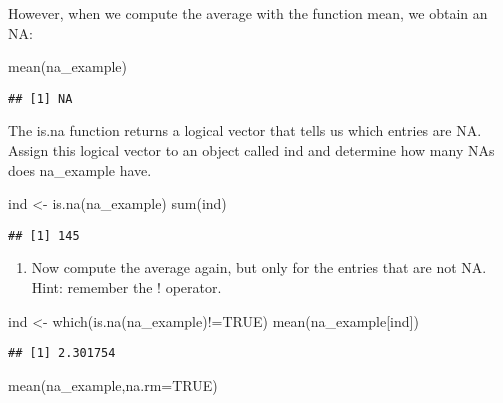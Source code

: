 \documentclass[
]{article}
\newenvironment{Shaded}{\begin{snugshade}}{\end{snugshade}}
\newcommand{\AttributeTok}[1]{\textcolor[rgb]{0.77,0.63,0.00}{#1}}
\newcommand{\ConstantTok}[1]{\textcolor[rgb]{0.00,0.00,0.00}{#1}}
\newcommand{\FunctionTok}[1]{\textcolor[rgb]{0.00,0.00,0.00}{#1}}
\newcommand{\NormalTok}[1]{#1}
\newcommand{\OtherTok}[1]{\textcolor[rgb]{0.56,0.35,0.01}{#1}}
\newcommand{\SpecialCharTok}[1]{\textcolor[rgb]{0.00,0.00,0.00}{#1}}
\providecommand{\tightlist}{%
  \setlength{\itemsep}{0pt}\setlength{\parskip}{0pt}}
\begin{document}
However, when we compute the average with the function mean, we obtain
an NA:

\begin{Shaded}
\begin{Highlighting}[]
\FunctionTok{mean}\NormalTok{(na\_example)}
\end{Highlighting}
\end{Shaded}

\begin{verbatim}
## [1] NA
\end{verbatim}

The is.na function returns a logical vector that tells us which entries
are NA. Assign this logical vector to an object called ind and determine
how many NAs does na\_example have.

\begin{Shaded}
\begin{Highlighting}[]
\NormalTok{ind }\OtherTok{\textless{}{-}} \FunctionTok{is.na}\NormalTok{(na\_example)}
\FunctionTok{sum}\NormalTok{(ind)}
\end{Highlighting}
\end{Shaded}

\begin{verbatim}
## [1] 145
\end{verbatim}

\begin{enumerate}
\def\labelenumi{\arabic{enumi}.}
\setcounter{enumi}{7}
\tightlist
\item
  Now compute the average again, but only for the entries that are not
  NA. Hint: remember the ! operator.
\end{enumerate}

\begin{Shaded}
\begin{Highlighting}[]
\NormalTok{ind }\OtherTok{\textless{}{-}} \FunctionTok{which}\NormalTok{(}\FunctionTok{is.na}\NormalTok{(na\_example)}\SpecialCharTok{!=}\ConstantTok{TRUE}\NormalTok{)}
\FunctionTok{mean}\NormalTok{(na\_example[ind])}
\end{Highlighting}
\end{Shaded}

\begin{verbatim}
## [1] 2.301754
\end{verbatim}

\begin{Shaded}
\begin{Highlighting}[]
\FunctionTok{mean}\NormalTok{(na\_example,}\AttributeTok{na.rm=}\ConstantTok{TRUE}\NormalTok{)}
\end{Highlighting}
\end{Shaded}
\end{document}
